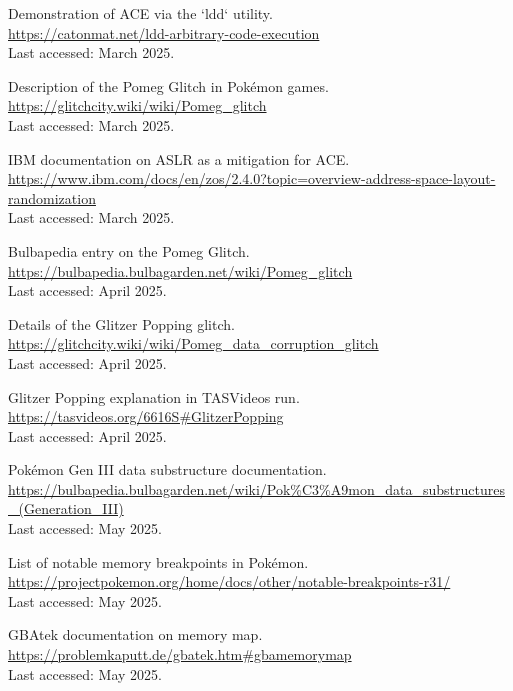 \documentclass[a4paper]{usiinfbachelorproject}
\begin{document}
\begin{thebibliography}{99}
	Demonstration of ACE via the `ldd` utility.\\
	\url{https://catonmat.net/ldd-arbitrary-code-execution}\\
	Last accessed: March 2025.

	Description of the Pomeg Glitch in Pokémon games.\\
	\url{https://glitchcity.wiki/wiki/Pomeg_glitch}\\
	Last accessed: March 2025.

	IBM documentation on ASLR as a mitigation for ACE.\\
	\url{https://www.ibm.com/docs/en/zos/2.4.0?topic=overview-address-space-layout-randomization}\\
	Last accessed: March 2025.





	Bulbapedia entry on the Pomeg Glitch.\\
	\url{https://bulbapedia.bulbagarden.net/wiki/Pomeg_glitch}\\
	Last accessed: April 2025.


	Details of the Glitzer Popping glitch.\\
	\url{https://glitchcity.wiki/wiki/Pomeg_data_corruption_glitch}\\
	Last accessed: April 2025.


	Glitzer Popping explanation in TASVideos run.\\
	\url{https://tasvideos.org/6616S#GlitzerPopping}\\
	Last accessed: April 2025.


	Pokémon Gen III data substructure documentation.\\
	\url{https://bulbapedia.bulbagarden.net/wiki/Pok%C3%A9mon_data_substructures_(Generation_III)}\\
	Last accessed: May 2025.


	List of notable memory breakpoints in Pokémon.\\
	\url{https://projectpokemon.org/home/docs/other/notable-breakpoints-r31/}\\
	Last accessed: May 2025.


	GBAtek documentation on memory map.\\
	\url{https://problemkaputt.de/gbatek.htm#gbamemorymap}\\
	Last accessed: May 2025.



\end{thebibliography}
\end{document}
